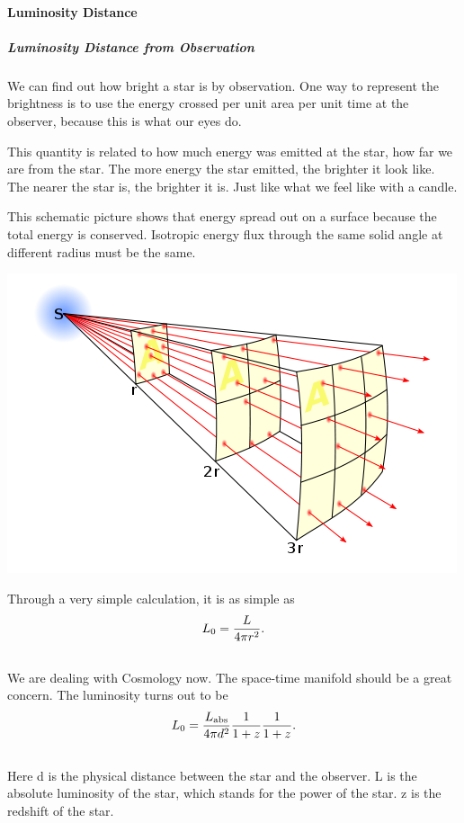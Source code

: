 \documentclass[letterpaper,10pt,english]{sphinxmanual}
\begin{document}
{\paragraph{Luminosity Distance}
\label{Cosmology/cosmoIndex:luminosity-distance}

\subparagraph{Luminosity Distance from Observation}
\label{Cosmology/cosmoIndex:luminosity-distance-from-observation}
We can find out how bright a star is by observation. One way to represent the brightness is to use the energy crossed per unit area per unit time at the observer, because this is what our eyes do.

This quantity is related to how much energy was emitted at the star, how far we are from the star. The more energy the star emitted, the brighter it look like. The nearer the star is, the brighter it is. Just like what we feel like with a candle.

This schematic picture shows that energy spread out on a surface because the total energy is conserved. Isotropic energy flux through the same solid angle at different radius must be the same.

{\hfill\includegraphics{InverseSquareLaw.png}\hfill}

Through a very simple calculation, it is as simple as
\begin{gather}
\begin{split}L_0 = \frac{ L }{ 4\pi r^2 } .\end{split}\notag\\\begin{split}\end{split}\notag
\end{gather}
We are dealing with Cosmology now. The space-time manifold should be a great concern. The luminosity turns out to be
\begin{gather}
\begin{split}L_0 = \frac{L_\mathrm{abs} }{4\pi d^2} \frac{1}{1+z} \frac{1}{1+z} .\end{split}\notag\\\begin{split}\end{split}\notag
\end{gather}
Here d is the physical distance between the star and the observer. L is the absolute luminosity of the star, which stands for the power of the star. z is the redshift of the star.

}
\end{document}
